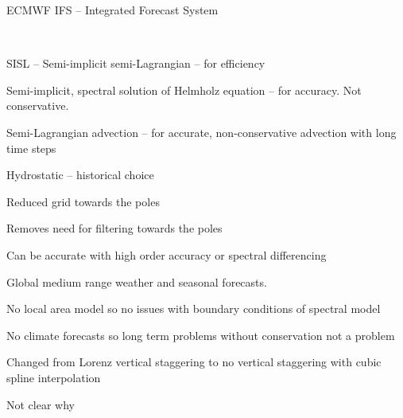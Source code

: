 \begin{slide}{ECMWF IFS -- Integrated Forecast System}

\ \\
\begin{list0}
\item SISL -- Semi-implicit semi-Lagrangian -- for efficiency
\begin{list1}
    \item Semi-implicit, spectral solution of Helmholz equation -- for accuracy. Not conservative.
    \item Semi-Lagrangian advection -- for accurate, non-conservative advection with long time steps
\end{list1}
\item Hydrostatic -- historical choice
\item Reduced grid towards the poles
\begin{list1}
    \item Removes need for filtering towards the poles
    \item Can be accurate with high order accuracy or spectral differencing
\end{list1}
\item Global medium range weather and seasonal forecasts.
\begin{list1}
    \item No local area model so no issues with boundary conditions of spectral model
    \item No climate forecasts so long term problems without conservation not a problem
\end{list1}
\item Changed from Lorenz vertical staggering to no vertical staggering with cubic spline interpolation
\begin{list1}
    \item Not clear why
\end{list1}
\end{list0}
\end{slide}

